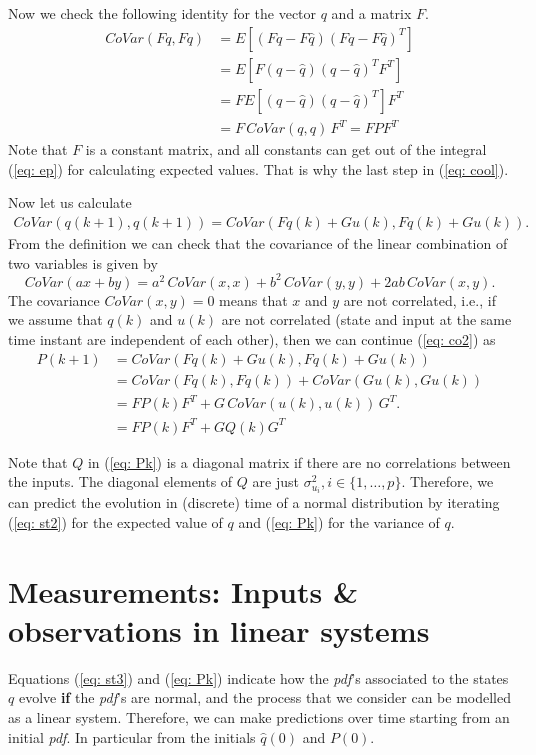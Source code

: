 \documentclass[11pt,a4paper]{article}
\begin{document}
Now we check the following identity for the vector $q$ and a matrix $F$.
\begin{align}
	CoVar(Fq,Fq) &= E[(Fq-F\hat q)(Fq-F\hat q)^T] \nonumber \\
	&= E[F(q-\hat q)(q -\hat q)^TF^T] \nonumber \\
	&= F E[(q-\hat q)(q -\hat q)^T] F^T \nonumber \\
	&= F \, CoVar(q,q) \, F^T = F P F^T \label{eq: cool}
\end{align}
Note that $F$ is a constant matrix, and all constants can get out of the integral (\ref{eq: ep}) for calculating expected values. That is why the last step in (\ref{eq: cool}).

Now let us calculate
\begin{align}
	CoVar(q(k+1), q(k+1)) = CoVar(Fq(k)+Gu(k),Fq(k)+Gu(k)).
	\label{eq: co2}
\end{align}
From the definition we can check that the covariance of the linear combination of two variables is given by
\begin{equation}
	CoVar(ax + by) = a^2\,CoVar(x,x) + b^2\, CoVar(y,y) + 2ab \, CoVar(x,y).
\end{equation}
The covariance $CoVar(x,y) = 0$ means that $x$ and $y$ are not correlated, i.e., if we assume that $q(k)$ and $u(k)$ are not correlated (state and input at the same time instant are independent of each other), then we can continue (\ref{eq: co2}) as
\begin{align}
	P(k+1) &= CoVar(Fq(k)+Gu(k),Fq(k)+Gu(k)) \nonumber \\
	&= CoVar(Fq(k),Fq(k)) + CoVar(Gu(k),Gu(k)) \nonumber \\
	&= FP(k)F^T + G\,CoVar(u(k),u(k))\,G^T. \nonumber \\
	&= FP(k)F^T + GQ(k)G^T\label{eq: Pk}
\end{align}

Note that $Q$ in (\ref{eq: Pk}) is a diagonal matrix if there are no correlations between the inputs. The diagonal elements of $Q$ are just $\sigma^2_{u_i}, i\in\{1,\dots,p\}$. Therefore, we can predict the evolution in (discrete) time of a normal distribution by iterating (\ref{eq: st2}) for the expected value of $q$ and (\ref{eq: Pk}) for the variance of $q$.

\section{Measurements: Inputs \& observations in linear systems}
Equations (\ref{eq: st3}) and (\ref{eq: Pk}) indicate how the \emph{pdf}'s associated to the states $q$ evolve \textbf{if} the \emph{pdf}'s are normal, and the process that we consider can be modelled as a linear system. Therefore, we can make predictions over time starting from an initial \emph{pdf}. In particular from the initials $\hat q(0)$ and $P(0)$.
\end{document}
